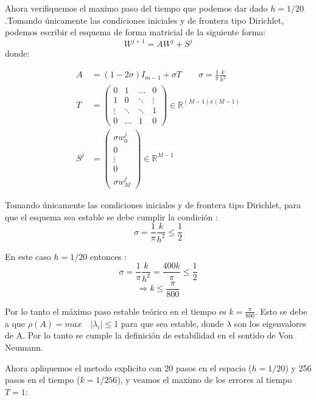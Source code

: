 \documentclass[11pt]{article}
\theoremstyle{definition}
\begin{document}
    Ahora verifiquemos el maximo paso del tiempo que podemos dar dado
\(h = 1/20\).Tomando únicamente las condiciones iniciales y de frontera tipo
Dirichlet, podemos escribir el esquema de forma matricial de la
siguiente forma: \[ W^{j+1}=AW^j+S^j \] donde:

\begin{align*}
A &= (1-2\sigma )I_{m-1} + \sigma T \qquad \sigma = \frac{1}{\pi} \frac{k}{h^2} \\
T &=\begin{pmatrix}
    0      & 1 & \dots  &0 \\
    1       & 0 & \ddots & \vdots \\
    \vdots & \ddots & \ddots  & 1 \\
    0 & \dots    & 1       & 0
\end{pmatrix} \in \mathbb{R}^{(M-1)x(M-1)}\\
S^j &=\begin{pmatrix}
    \sigma w_0^j  \\
    0  \\
    \vdots  \\
    0 \\
    \sigma w_M^j
\end{pmatrix} \in \mathbb{R}^{M-1}
\end{align*}

Tomando únicamente las condiciones iniciales y de frontera tipo
Dirichlet, para que el esquema sea estable se debe cumplir la condición
: \[\sigma = \frac{1}{\pi} \frac{k}{h^2} \leq \frac{1}{2} \]

En este caso \(h=1/20\) entonces
:\[\sigma = \frac{1}{\pi} \frac{k}{h^2}= \frac{400k}{\pi} \leq \frac{1}{2} \]
\[\Rightarrow k \leq \frac{\pi}{800}\]

Por lo tanto el máximo paso estable teórico en el tiempo es
\(k=\frac{\pi}{800}\). Esto se debe a que
\(\rho (A) =max\quad \vert \lambda_i \vert \leq 1\) para que sea
estable, donde $ \lambda $ son los eigenvalores de A. Por lo tanto se
cumple la definición de estabilidad en el sentido de Von Neumann.

Ahora apliquemos el metodo explicito con 20 pasos en el espacio
(\(h = 1/20\)) y 256 pasos en el tiempo (\(k = 1/256\)), y veamos el
maximo de los errores al tiempo \(T = 1\):
\end{document}
